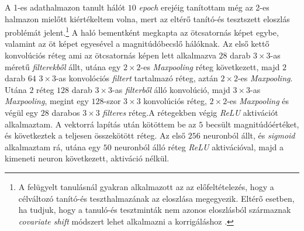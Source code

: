 \documentclass[12pt,letterpaper,twoside,openright]{book}
\begin{document}
A 1-es adathalmazon tanult hálót $10$ \textit{epoch} erejéig tanítottam még az 2-es halmazon mielőtt kiértékeltem volna, mert az eltérő tanító-és tesztszett eloszlás problémát jelent.\footnote{A felügyelt tanulásnál gyakran alkalmazott az az előfeltételezés, hogy a célváltozó tanító-és teszthalmazának az eloszlása megegyezik. Eltérő esetben, ha tudjuk, hogy a tanuló-és tesztminták nem azonos eloszlásból származnak \textit{covariate shift} módszert lehet alkalmazni a korrigáláshoz \cite{covs}.}
\newline\indent
A haló bementként megkapta az ötcsatornás képet egybe, valamint az öt képet egyesével a magnitúdóbecslő hálóknak. Az első kettő konvolúciós réteg ami az ötcsatornás képen lett alkalmazva $28$ darab $3\times3$-as méretű \textit{filterekből} állt, utána egy $2\times 2$-es \textit{Maxpooling} réteg következett, majd $2$ darab $64$ $3\times 3$-as konvolóciós \textit{filtert} tartalmazó réteg, aztán $2\times 2$-es \textit{Maxpooling}. Utána $2$ réteg $128$ darab $3\times 3$-as \textit{filterből} álló konvolúció, majd $3\times 3$-as \textit{Maxpooling}, megint egy $128$-szor $3\times 3$ konvolúciós réteg, $2\times 2$-es \textit{Maxpooling} és végül egy $28$ darabos $3\times 3$ \textit{filteres} réteg.A rétegekben végig \textit{ReLU} aktivációt alkalmaztam. A vektorrá lapítás után kötöttem be az $5$ becsült magnitúdóértéket, és következtek a teljesen összekötött réteg. Az első $256$ neuronból állt, és \textit{sigmoid} alkalmaztam rá, utána egy $50$ neuronból álló réteg \textit{ReLU} aktivációval, majd a kimeneti neuron következett, aktiváció nélkül.
\end{document}
